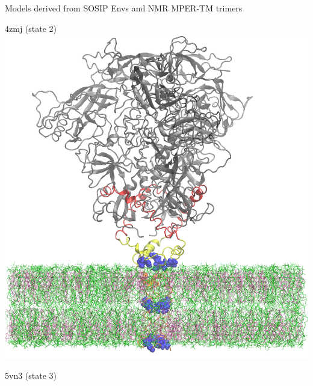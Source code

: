 \begin{frame}[fragile]{Models derived from SOSIP Envs and NMR MPER-TM trimers}
    \begin{center}
        \begin{minipage}{0.47\textwidth}
            \begin{center}
                4zmj (state 2)\\
                \includegraphics[width=\textwidth]{4zmj-mper-tm-example.png}
            \end{center}
        \end{minipage}
        \begin{minipage}{0.47\textwidth}
            \begin{center}
                5vn3 (state 3)\\

\end{center}
\end{minipage}
\end{center}
\end{frame}
